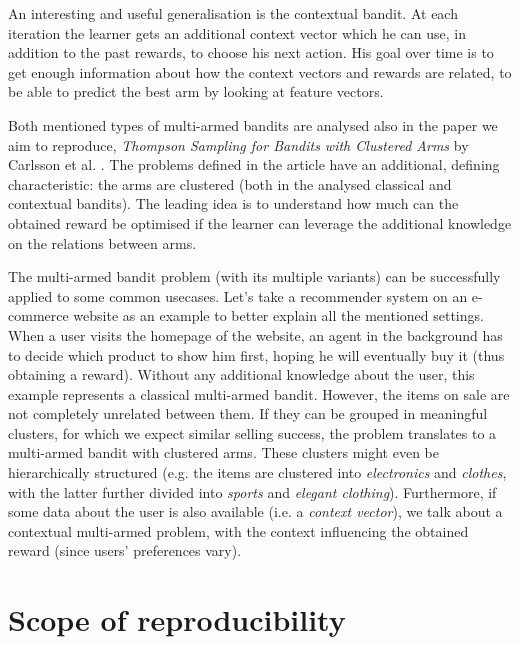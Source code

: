 An interesting and useful generalisation is the contextual bandit. At each iteration the learner gets an additional context vector which he can use, in addition to the past rewards, to choose his next action. His goal over time is to get enough information about how the context vectors and rewards are related, to be able to predict the best arm by looking at feature vectors.

Both mentioned types of multi-armed bandits are analysed also in the paper we aim to reproduce, \emph{Thompson Sampling for Bandits with Clustered Arms} by Carlsson et al. \cite{bandits}. The problems defined in the article have an additional, defining characteristic: the arms are clustered (both in the analysed classical and contextual bandits). The leading idea is to understand how much can the obtained reward be optimised if the learner can leverage the additional knowledge on the relations between arms.

The multi-armed bandit problem (with its multiple variants) can be successfully applied to some common usecases. Let's take a recommender system on an e-commerce website as an example to better explain all the mentioned settings. When a user visits the homepage of the website, an agent in the background has to decide which product to show him first, hoping he will eventually buy it (thus obtaining a reward). Without any additional knowledge about the user, this example represents a classical multi-armed bandit. However, the items on sale are not completely unrelated between them. If they can be grouped in meaningful clusters, for which we expect similar selling success, the problem translates to a multi-armed bandit with clustered arms. These clusters might even be hierarchically structured (e.g. the items are clustered into \emph{electronics} and \emph{clothes}, with the latter further divided into \emph{sports} and \emph{elegant clothing}). Furthermore, if some data about the user is also available (i.e. a \emph{context vector}), we talk about a contextual multi-armed problem, with the context influencing the obtained reward (since users' preferences vary).

\section{Scope of reproducibility}
\label{sec:claims}

